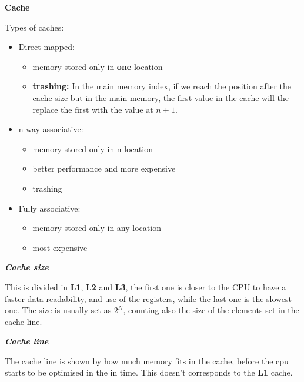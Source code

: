 \documentclass[fontsize=8pt, a4paper, landscape, fleqn]{scrartcl}
\renewcommand{\subsection}[1]{%
    \noindent\colorbox{subsectioncolor}{%
        \parbox{\dimexpr\columnwidth-2\fboxsep}{\color{white}\textbf{#1}}}%
    \vspace{0.5mm}%
}
\renewcommand{\subsubsection}[1]{%
    \noindent\textbf{\textit{\color{subsectioncolor}#1}}%
    \vspace{1mm}%
}
\begin{document}
\begin{multicols*}{3}[\raggedcolumns]
    \subsection{Cache} 
    Types of caches:
    \begin{multicols}{2}
    \begin{itemize}
        \item Direct-mapped:
        \begin{itemize}
            \item memory stored only in \textbf{one} location
            \item \textbf{trashing:} In the main memory index, if we reach the position after the cache size but in the main memory, the first value in the cache will the replace the first with the value at $n+1$.
        \end{itemize}
        \item n-way associative:
        \begin{itemize}
            \item memory stored only in n location
            \item better performance and more expensive
            \item trashing
        \end{itemize}
        \item Fully associative:
        \begin{itemize}
            \item memory stored only in any location
            \item most expensive
        \end{itemize}
    \end{itemize}
    \end{multicols}
    \subsubsection{Cache size}
    This is divided in \textbf{L1}, \textbf{L2} and \textbf{L3}, the first one is closer to the CPU to have a faster data readability, and use of the registers, while the last one is the slowest one. The size is usually set as $2^N$, counting also the size of the elements set in the cache line.
    
    \subsubsection{Cache line}
    The cache line is shown by how much memory fits in the cache, before the cpu starts to be optimised in the in time. This doesn't corresponds to the \textbf{L1} cache.
    

\end{multicols*}
\end{document}
